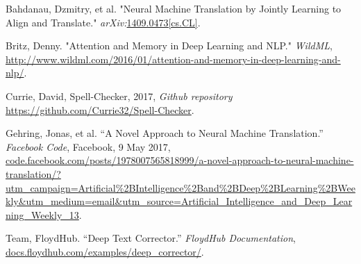 \documentclass[11pt,a4paper]{scrartcl}
\theoremstyle{definition}
\begin{document}
\begin{thebibliography}{7}
 Bahdanau, Dzmitry, et al. "Neural Machine Translation by Jointly Learning to Align and Translate." \emph{arXiv:}\url{1409.0473[cs.CL]}.

 Britz, Denny. "Attention and Memory in Deep Learning and NLP." \emph{WildML}, \url{http://www.wildml.com/2016/01/attention-and-memory-in-deep-learning-and-nlp/}.

 Currie, David, Spell-Checker, 2017, \emph{Github repository} \url{https://github.com/Currie32/Spell-Checker}.

 Gehring, Jonas, et al. “A Novel Approach to Neural Machine Translation.” \emph{Facebook Code}, Facebook, 9 May 2017, \url{code.facebook.com/posts/1978007565818999/a-novel-approach-to-neural-machine-translation/?utm_campaign=Artificial%2BIntelligence%2Band%2BDeep%2BLearning%2BWeekly&utm_medium=email&utm_source=Artificial_Intelligence_and_Deep_Learning_Weekly_13}.

 Team, FloydHub. “Deep Text Corrector.” \emph{FloydHub Documentation}, \url{docs.floydhub.com/examples/deep_corrector/}.

\end{thebibliography}
\end{document}

